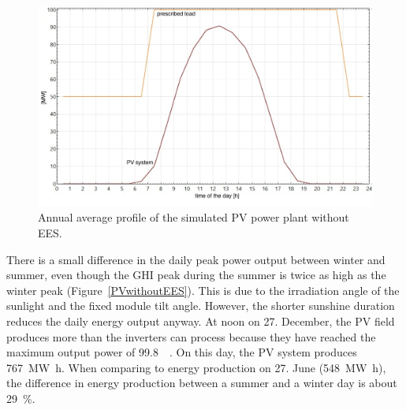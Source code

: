 \begin{figure}[htbp]  
\centering
\includegraphics[width=0.9\linewidth]{FIG/PVwithoutEESanual}
\caption[Annual average profile of the simulated PV power plant without EES.]{Annual average profile of the simulated PV power plant without EES.}\label{PVwithoutEESanual}
\end{figure}

There is a small difference in the daily peak power output between winter and summer, even though the \ac{GHI} peak during the summer is twice as high as the winter peak (Figure~\ref{PVwithoutEES}). This is due to the irradiation angle of the sunlight and the fixed module tilt angle. However, the shorter sunshine duration reduces the daily energy output anyway. At noon on 27. December, the \ac{PV} field produces more than the inverters can process because they have reached the maximum output power of \SI{99.8}{\mega\wattsac}. On this day, the \ac{PV} system produces \SI{767}{\mega\watt\hour}. When comparing to energy production on 27. June (\SI{548}{\mega\watt\hour}), the difference in energy production between a summer and a winter day is about \SI{29}{\percent}.

